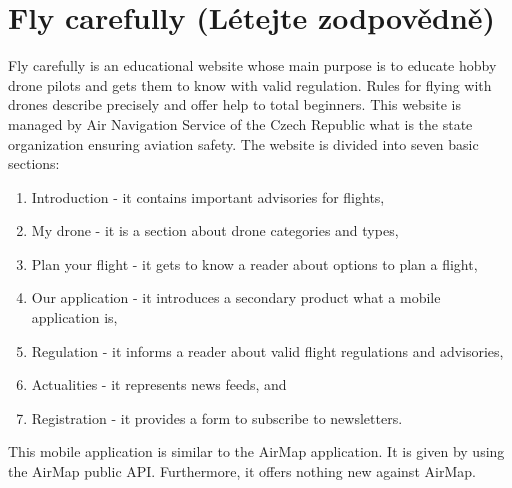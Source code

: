 \section{Fly carefully (L{\' e}tejte zodpov{\v e}dn{\v e})}\label{sec:fly-carefully}
Fly carefully is an educational website whose main purpose is to educate hobby drone pilots and gets them to know with valid regulation.
Rules for flying with drones describe precisely and offer help to total beginners.
This website is managed by Air Navigation Service of the Czech Republic what is the state organization ensuring aviation safety.
The website is divided into seven basic sections:
\begin{enumerate}
    \item Introduction - it contains important advisories for flights,
    \item My drone - it is a section about drone categories and types,
    \item Plan your flight - it gets to know a reader about options to plan a flight,
    \item Our application - it introduces a secondary product what a mobile application is,
    \item Regulation - it informs a reader about valid flight regulations and advisories,
    \item Actualities - it represents news feeds, and
    \item Registration - it provides a form to subscribe to newsletters.\cite{flyCarefully}
\end{enumerate}
This mobile application is similar to the AirMap application.
It is given by using the AirMap public API.
Furthermore, it offers nothing new against AirMap.
